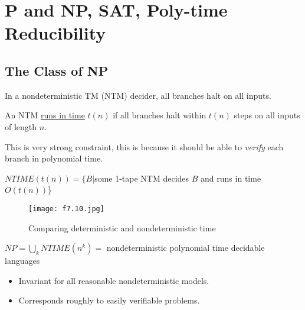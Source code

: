 \chapter{P and NP, SAT, Poly-time Reducibility}

\section{The Class of NP}

In a nondeterministic TM (NTM) decider, all branches halt on all inputs.
\begin{definition}
    An NTM \underline{runs in time} \(t(n)\) if all branches halt within \(t(n)\) steps on all inputs of length \(n\).  
    \begin{intuition}
        This is very strong constraint, this is because it should be able to \textit{verify} each branch in polynomial time. 
    \end{intuition}
\end{definition}

\begin{definition}
    \(NTIME(t(n)) = \{ B | \)some 1-tape NTM decides \(B\) and runs in time \(O(t(n))\)\}  

    \begin{figure}[H]
        \centering
        \texttt{[image: f7.10.jpg]}
        \caption{Comparing deterministic and nondeterministic time}
    \end{figure}
\end{definition}


\begin{definition}
    \(NP = \bigcup_k NTIME(n^k) = \) nondeterministic polynomial time decidable languages 
\end{definition}

\begin{itemize}
    \item Invariant for all reasonable nondeterministic models.
    \item Corresponds roughly to easily verifiable problems.
\end{itemize}

